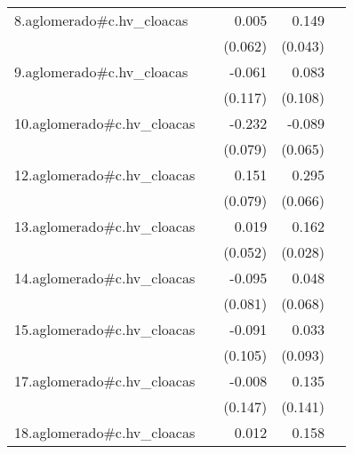 {\begin{longtable}{l*{4}{D{.}{.}{-1}}}
\addlinespace
8.aglomerado#c.hv\_cloacas&                     &       0.005         &       0.149\sym{***}&                     \\
            &                     &     (0.062)         &     (0.043)         &                     \\
\addlinespace
9.aglomerado#c.hv\_cloacas&                     &      -0.061         &       0.083         &                     \\
            &                     &     (0.117)         &     (0.108)         &                     \\
\addlinespace
10.aglomerado#c.hv\_cloacas&                     &      -0.232\sym{**} &      -0.089         &                     \\
            &                     &     (0.079)         &     (0.065)         &                     \\
\addlinespace
12.aglomerado#c.hv\_cloacas&                     &       0.151         &       0.295\sym{***}&                     \\
            &                     &     (0.079)         &     (0.066)         &                     \\
\addlinespace
13.aglomerado#c.hv\_cloacas&                     &       0.019         &       0.162\sym{***}&                     \\
            &                     &     (0.052)         &     (0.028)         &                     \\
\addlinespace
14.aglomerado#c.hv\_cloacas&                     &      -0.095         &       0.048         &                     \\
            &                     &     (0.081)         &     (0.068)         &                     \\
\addlinespace
15.aglomerado#c.hv\_cloacas&                     &      -0.091         &       0.033         &                     \\
            &                     &     (0.105)         &     (0.093)         &                     \\
\addlinespace
17.aglomerado#c.hv\_cloacas&                     &      -0.008         &       0.135         &                     \\
            &                     &     (0.147)         &     (0.141)         &                     \\
\addlinespace
18.aglomerado#c.hv\_cloacas&                     &       0.012         &       0.158\sym{***}&                     \\

\end{longtable}}
